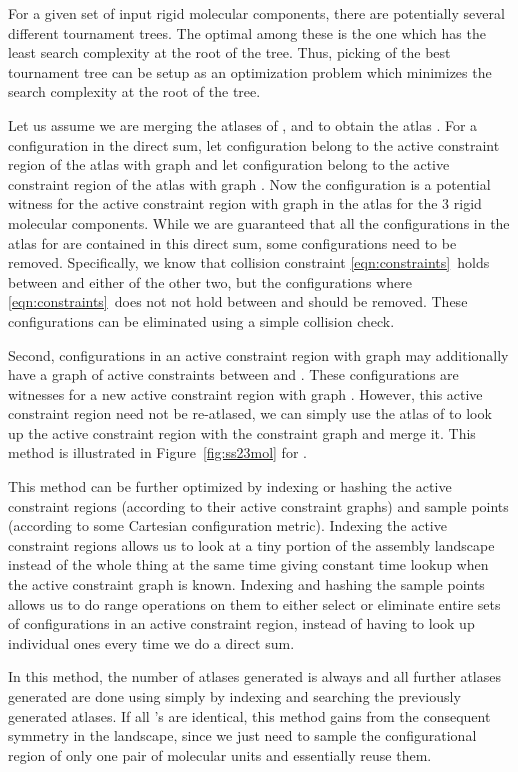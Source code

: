 \documentclass[]{article}
\newcommand{\figref}[1]{Figure~\ref{#1}}
\newcommand{\rmc}{rigid molecular component}
\newcommand{\cone}{\ref{eqn:constraints}}
\begin{document}
For a given set of input \rmc s, there are  potentially several different 
tournament trees. The optimal among these is the one which has the least
search complexity at the root of the tree. Thus, picking of the best
tournament tree can be setup as an optimization problem which minimizes
the search complexity at the root of the tree.

Let us assume we are merging the atlases of ,  and  to
obtain the atlas .  For a configuration 
in the direct sum, let configuration  belong to the active
constraint region of the atlas  with graph  and let
configuration  belong to the active constraint region of the atlas
 with graph . Now the configuration 
is a potential witness for the active constraint region with graph  in the atlas  for the 3 \rmc s. While we are guaranteed that
all the configurations in the atlas for  are contained in this
direct sum, some configurations need to be removed.  Specifically, we know that
collision constraint \cone\ holds between  and either of the other two,
but the configurations where \cone\ does not not hold between  and 
should be removed. These configurations can be eliminated using a simple
collision check.

Second, configurations in an active constraint region with graph  may additionally have a graph of active constraints  between
 and . These configurations are witnesses for a new active constraint
region with graph . However, this active constraint
region need not be re-atlased, we can simply use the atlas of  to look up
the active constraint region with the constraint graph  and merge it.
This method is illustrated in \figref{fig:ss23mol} for .

This method can be further optimized by indexing or hashing the active constraint regions
(according to their active constraint graphs) and sample points (according to
some Cartesian configuration metric). Indexing the active constraint regions
allows us to look at a tiny portion of the assembly landscape instead of the
whole thing at the same time giving constant time lookup when the active
constraint graph is known.  Indexing and hashing the sample points allows us to do range
operations on them to either select or eliminate entire sets of configurations
in an active constraint region, instead of having to look up individual ones
every time we do a direct sum.

In this method, the number of atlases generated is always  and all
further atlases generated are done using simply by indexing and searching the
previously generated atlases. 
If all 's are identical, this method gains from the consequent
symmetry in the landscape, since we just need to sample the
configurational region of only one pair of molecular units and essentially
reuse them. 
\end{document}
